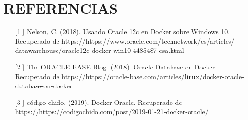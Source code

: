 \section{REFERENCIAS} 

\begin{itemize}
	 \item [[1]] Nelson, C. (2018). Usando Oracle 12c en Docker sobre Windows 10. Recuperado de https://https://www.oracle.com/technetwork/es/articles/			datawarehouse/oracle12c-docker-win10-4485487-esa.html
  	\item [[2]] The ORACLE-BASE Blog. (2018). Oracle Database en Docker. Recuperado de https://https://oracle-base.com/articles/linux/docker-oracle-			database-on-docker
	\item [[3]] código chido. (2019). Docker Oracle. Recuperado de https://https://codigochido.com/post/2019-01-21-docker-oracle/
        
       
\end{itemize}


